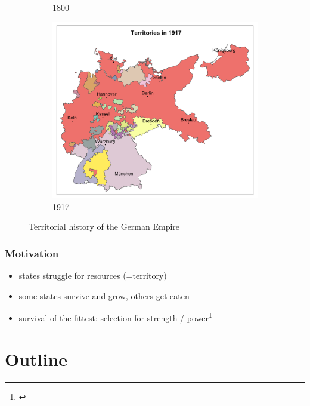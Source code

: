 \documentclass{beamer}
\begin{document}
\begin{frame}
\begin{figure}
\begin{subfigure}[b]{0.3\textwidth}
         \caption{1800}
         \label{fig:map1800}
     \end{subfigure}
    \hfill
     \begin{subfigure}[b]{0.3\textwidth}
         \centering
         \includegraphics[width=\textwidth]{paper/output/slides/map_terrs_1917.png}
         \caption{1917}
         \label{fig:map1917}
     \end{subfigure}
        \caption{Territorial history of the German Empire}
        \label{fig:terrmaps}
\end{figure}
    
\end{frame}

\begin{frame}
\frametitle{Motivation}



\begin{itemize}
    \item states struggle for resources (=territory)
    \item some states survive and grow, others get eaten
   \item survival of the fittest: selection for strength / power\footnote[frame,1]{\cite{levine2021}}
\end{itemize}
    
\end{frame}


\section{Outline} %
\end{document}
